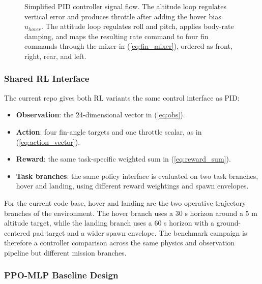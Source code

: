 \documentclass[10pt,twocolumn]{article}
\begin{document}
\begin{figure}[t]
{
}
\caption{Simplified PID controller signal flow. The altitude loop regulates vertical error and produces throttle after adding the hover bias $u_{hover}$. The attitude loop regulates roll and pitch, applies body-rate damping, and maps the resulting rate command to four fin commands through the mixer in (\ref{eq:fin_mixer}), ordered as front, right, rear, and left.}
\label{fig:pid_setup}
\end{figure}

\subsubsection{Shared RL Interface}

The current repo gives both RL variants the same control interface as PID:
\begin{itemize}
    \item \textbf{Observation}: the 24-dimensional vector in (\ref{eq:obs}).
    \item \textbf{Action}: four fin-angle targets and one throttle scalar, as in (\ref{eq:action_vector}).
    \item \textbf{Reward}: the same task-specific weighted sum in (\ref{eq:reward_sum}).
    \item \textbf{Task branches}: the same policy interface is evaluated on two task branches, hover and landing, using different reward weightings and spawn envelopes.
\end{itemize}

For the current code base, hover and landing are the two operative trajectory branches of the environment. The hover branch uses a 30 s horizon around a 5 m altitude target, while the landing branch uses a 60 s horizon with a ground-centered pad target and a wider spawn envelope. The benchmark campaign is therefore a controller comparison across the same physics and observation pipeline but different mission branches.

\subsubsection{PPO-MLP Baseline Design}
\end{document}
